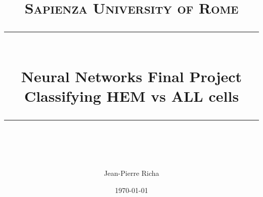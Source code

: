 \documentclass{article}
\begin{document}

\newcommand{\horrule}[1]{\rule{\linewidth}{#1}}
{\centering
\title{
\normalfont \normalsize
\textsc{Sapienza University of Rome} \\ [25pt]
\horrule{0.5pt} \\[0.4cm] %
\LARGE Neural Networks Final Project \\ %
\large Classifying HEM vs ALL cells \\
\horrule{2pt} \\[0.5cm] %
}

\author{Jean-Pierre Richa} %

\date{\normalsize\today \vskip 0.7in} %


}
\maketitle



\end{document}

